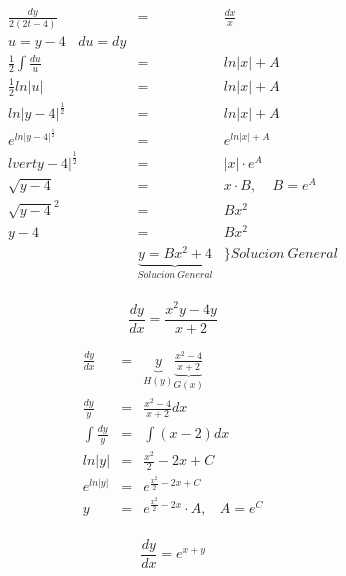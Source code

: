 \documentclass{article}
\begin{document}
\begin{eqnarray}
\nonumber \frac{dy}{2\left(2t-4 \right)} &=& \frac{dx}{x}  \\
\nonumber u = y-4 \ \ \ \ du = dy  & & \\
\nonumber \frac{1}{2} \int \frac{du}{u} &=& ln \lvert x \rvert + A\\
\nonumber \frac{1}{2} ln \lvert u \rvert &=& ln \lvert x \rvert + A \\
\nonumber ln{\lvert y-4 \rvert }^{\frac{1}{2}} &=& ln \lvert x \rvert +A \\
\nonumber e^{ln{\lvert y-4 \rvert }^{\frac{1}{2}}} &=& e^{ ln \lvert x \rvert + A } \\
\nonumber {lvert y-4 \rvert}^{\frac{1}{2}}  &=& \lvert x \rvert \cdot e^A \\
\nonumber \sqrt{y-4} &=& x \cdot B, \ \ \ \ \ B =  e^A  \\
\nonumber {\sqrt{y-4}}^2 &=& Bx^2 \\
\nonumber y-4 &=& Bx^2 \\ 
\nonumber  & \underbrace{y = Bx^2 + 4}_{Solucion \ General} & \rbrace Solucion \ General \\
\end{eqnarray}


\begin{equation}
\frac{dy}{dx} = \frac{x^2 y -4y}{x+2}
\end{equation}

\begin{eqnarray}
\nonumber \frac{dy}{dx} &=& \underbrace{y}_{H\left( y \right)} \underbrace{\frac{x^2 -4}{x+2}}_{G\left( x \right)} \\
\nonumber \frac{dy}{y} &=& \frac{x^2 -4}{x+2} dx \\
\nonumber \int \frac{dy}{y} &=& \int \left( x-2 \right)dx  \\
\nonumber ln \lvert y \rvert &=& \frac{x^2}{2} - 2x + C \\
\nonumber e^{ln \lvert y \rvert} &=& e^{\frac{x^2}{2} - 2x + C} \\
\nonumber y &=& e^{\frac{x^2}{2} - 2x } \cdot A , \ \ \ \ A = e^C \\
\end{eqnarray}

\begin{equation}
\frac{dy}{dx} = e^{x+y}
\end{equation}
\end{document}
